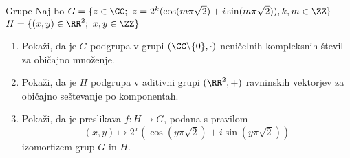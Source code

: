 \begin{frame}{Grupe}
	Naj bo
	$
	G=\{z \in \CC; \ z = 2^{k}(\cos(m\pi\sqrt{2}) + i\sin(m\pi\sqrt{2})), k,m \in \ZZ\}
	$
	$
	H=\{(x,y)\in {\RR}^2; \ x,y \in \ZZ \}
	$
	\begin{enumerate}
		\item
			Pokaži, da je $G$ podgrupa v grupi $(\CC \backslash \{0\}, \cdot ) $
			neničelnih kompleksnih števil za običajno množenje.
		\item
			Pokaži, da je $H$ podgrupa v aditivni grupi $ ({\RR}^2,+) $
			ravninskih vektorjev za običajno seštevanje po komponentah.
		\item
			Pokaži, da je preslikava $f:H\to G$, podana s pravilom
			$$
			(x,y) \mapsto 2^{x}(\cos(y\pi\sqrt{2}) + i\sin(y\pi\sqrt{2}))
			$$
			izomorfizem grup $G$ in $H$.
	\end{enumerate}
\end{frame}
